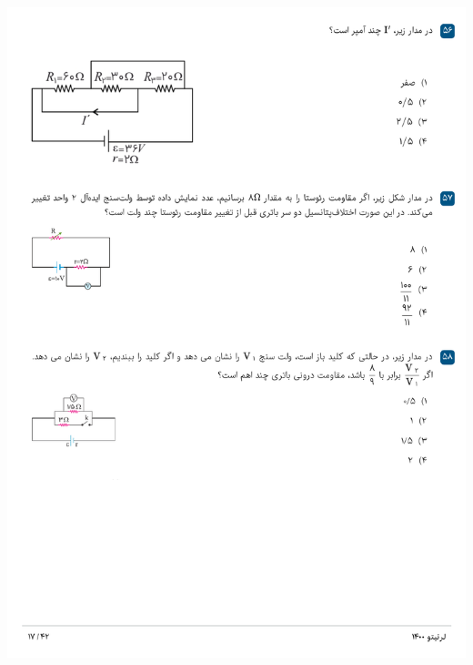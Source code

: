 \documentclass{book}
\begin{document}
\includegraphics[width=\textwidth]{"pages/17"}
\end{document}
